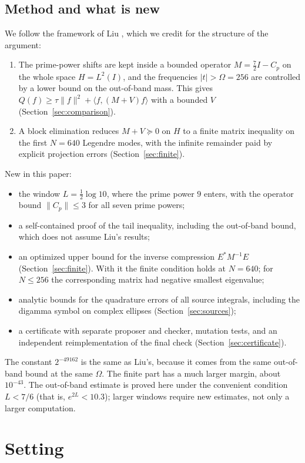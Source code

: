 \documentclass[11pt]{amsart}
\theoremstyle{remark}
\numberwithin{equation}{section}
\begin{document}
\subsection{Method and what is new}
We follow the framework of Liu \cite{Liu2026}, which we credit for the structure of the argument:
\begin{enumerate}
\item The prime-power shifts are kept inside a bounded operator $M=\frac72I-C_p$ on the whole space $H=L^2(I)$, and the frequencies $|t|>\Omega=256$ are controlled by a lower bound on the out-of-band mass. This gives $Q(f)\ge\tau\|f\|^2+\langle f,(M+V)f\rangle$ with a bounded $V$ (Section~\ref{sec:comparison}).
\item A block elimination reduces $M+V\succeq0$ on $H$ to a finite matrix inequality on the first $N=640$ Legendre modes, with the infinite remainder paid by explicit projection errors (Section~\ref{sec:finite}).
\end{enumerate}
New in this paper:
\begin{itemize}
\item the window $L=\frac12\log10$, where the prime power $9$ enters, with the operator bound $\|C_p\|\le3$ for all seven prime powers;
\item a self-contained proof of the tail inequality, including the out-of-band bound, which does not assume Liu's results;
\item an optimized upper bound for the inverse compression $E^*M^{-1}E$ (Section~\ref{sec:finite}). With it the finite condition holds at $N=640$; for $N\le256$ the corresponding matrix had negative smallest eigenvalue;
\item analytic bounds for the quadrature errors of all source integrals, including the digamma symbol on complex ellipses (Section~\ref{sec:sources});
\item a certificate with separate proposer and checker, mutation tests, and an independent reimplementation of the final check (Section~\ref{sec:certificate}).
\end{itemize}
The constant $2^{-49162}$ is the same as Liu's, because it comes from the same out-of-band bound at the same $\Omega$. The finite part has a much larger margin, about $10^{-43}$. The out-of-band estimate is proved here under the convenient condition $L<7/6$ (that is, $e^{2L}<10.3$); larger windows require new estimates, not only a larger computation.

\section{Setting}\label{sec:setting}
\end{document}
